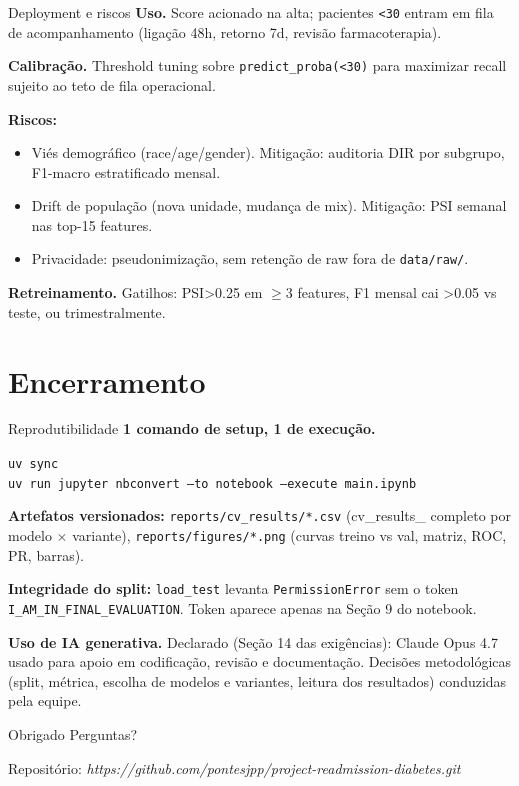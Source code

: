 \documentclass[aspectratio=169]{beamer}
\begin{document}
\begin{frame}{Deployment e riscos}
\textbf{Uso.} Score acionado na alta; pacientes \texttt{<30} entram em fila de acompanhamento (ligação 48h, retorno 7d, revisão farmacoterapia).

\vspace{0.5em}
\textbf{Calibração.} Threshold tuning sobre \texttt{predict\_proba(<30)} para maximizar recall sujeito ao teto de fila operacional.

\vspace{0.5em}
\textbf{Riscos:}
\begin{itemize}
  \item Viés demográfico (race/age/gender). Mitigação: auditoria DIR por subgrupo, F1-macro estratificado mensal.
  \item Drift de população (nova unidade, mudança de mix). Mitigação: PSI semanal nas top-15 features.
  \item Privacidade: pseudonimização, sem retenção de raw fora de \texttt{data/raw/}.
\end{itemize}

\vspace{0.5em}
\textbf{Retreinamento.} Gatilhos: PSI>0.25 em $\geq$3 features, F1 mensal cai >0.05 vs teste, ou trimestralmente.
\end{frame}

\section{Encerramento}

\begin{frame}{Reprodutibilidade}
\textbf{1 comando de setup, 1 de execução.}

\vspace{0.3em}
\small
\texttt{uv sync}\\
\texttt{uv run jupyter nbconvert --to notebook --execute main.ipynb}

\vspace{0.6em}
\textbf{Artefatos versionados:} \texttt{reports/cv\_results/*.csv} (cv\_results\_ completo por modelo $\times$ variante), \texttt{reports/figures/*.png} (curvas treino vs val, matriz, ROC, PR, barras).

\vspace{0.5em}
\textbf{Integridade do split:} \texttt{load\_test} levanta \texttt{PermissionError} sem o token \texttt{I\_AM\_IN\_FINAL\_EVALUATION}. Token aparece apenas na Seção 9 do notebook.

\vspace{0.5em}
\textbf{Uso de IA generativa.} Declarado (Seção 14 das exigências): Claude Opus 4.7 usado para apoio em codificação, revisão e documentação. Decisões metodológicas (split, métrica, escolha de modelos e variantes, leitura dos resultados) conduzidas pela equipe.
\end{frame}

\begin{frame}{Obrigado}
\centering
\Large Perguntas?

\vspace{1em}
\small
Repositório: \emph{https://github.com/pontesjpp/project-readmission-diabetes.git}
\end{frame}
\end{document}
